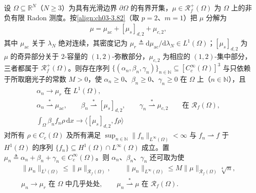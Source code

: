 \documentclass[../../main.tex]{subfiles}%
\begin{document}
\begin{lemma}[初值测度的三重逼近]\label{lemma:ch06-6.5.1}
设 $\Omega\subseteq\mathbb{R}^N$（$N\geqslant3$）为具有光滑边界 $\partial\Omega$ 的有界开集，$\mu\in\mathscr{R}^+_f(\Omega)$ 为 $\Omega$ 上的非负有限 Radon 测度。按\eqref{align:ch03-3.82}（取 $p=2$、$m=1$）把 $\mu$ 分解为
\begin{align*}
\mu=\mu_{\mathrm{ac}}+[\mu_s]_{d,2}+\mu_{c,2},
\end{align*}
其中 $\mu_{\mathrm{ac}}$ 关于 $\lambda_N$ 绝对连续，其密度记为 $\mu_r\triangleq\mathrm{d}\mu_{\mathrm{ac}}/\mathrm{d}\lambda_N\in L^1(\Omega)$；$[\mu_s]_{d,2}$ 为 $\mu$ 的奇异部分关于 $2$-容量的 $(1,2)$-弥散部分，$\mu_{c,2}$ 为相应的 $(1,2)$-集中部分，三者都属于 $\mathscr{R}^+_f(\Omega)$。则存在序列 $\{(\alpha_n,\beta_n,\gamma_n)\}_{n\in\mathbb{N}}\subseteq[C^\infty_c(\Omega)]^3$ 与只依赖于所取磨光子的常数 $M>0$，使 $\alpha_n\geqslant0$、$\beta_n\geqslant0$、$\gamma_n\geqslant0$ 在 $\Omega$ 上（$n\in\mathbb{N}$），且
\begin{align}
\alpha_n\to\mu_r\text{ 在 }L^1(\Omega), \label{align:ch6-6.41a}\\
\alpha_n\stackrel{*}{\rightharpoonup}\mu_{\mathrm{ac}},\qquad
\beta_n\stackrel{*}{\rightharpoonup}[\mu_s]_{d,2},\qquad
\gamma_n\stackrel{*}{\rightharpoonup}\mu_{c,2}
\qquad\text{在 }\mathscr{R}_f(\Omega), \label{align:ch6-6.41b}\\
\int_\Omega\beta_nf_n\rho\,\mathrm{d}x\to\langle[\mu_s]_{d,2},f\rho\rangle \label{align:ch6-6.41c}
\end{align}
对所有 $\rho\in C_c(\Omega)$ 及所有满足 $\sup_{n\in\mathbb{N}}\|f_n\|_{L^\infty(\Omega)}<\infty$ 与 $f_n\rightharpoonup f$ 于 $H^1(\Omega)$ 的序列 $\{f_n\}\subseteq H^1(\Omega)\cap L^\infty(\Omega)$ 成立。置 $\mu_n\triangleq\alpha_n+\beta_n+\gamma_n\in C^\infty_c(\Omega)$。则 $\alpha_n$、$\beta_n$、$\gamma_n$ 还可取为使
\begin{align}
\|\mu_n\|_{L^1(\Omega)}\leqslant\|\mu\|_{\mathscr{R}_f(\Omega)},\qquad
\|\mu_n\|_{L^\infty(\Omega)}\leqslant M\|\mu\|_{\mathscr{R}_f(\Omega)}\sqrt[4]{n}, \label{align:ch6-6.41d}\\
\mu_n\to\mu_r\text{ 在 }\Omega\text{ 中几乎处处},\qquad
\mu_n\stackrel{*}{\rightharpoonup}\mu\text{ 在 }\mathscr{R}_f(\Omega). \label{align:ch6-6.41e}
\end{align}
\end{lemma}
\end{document}
